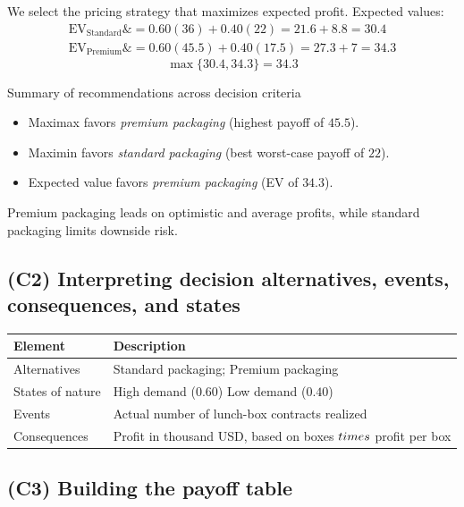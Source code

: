 \documentclass[11pt]{article}
\begin{document}
	
	We select the pricing strategy that maximizes expected profit. Expected values:
	\[
	\begin{aligned}
		\mathrm{EV}_{\text{Standard}} \&= 0.60(36) + 0.40(22) = 21.6 + 8.8 = 30.4 \\
		\mathrm{EV}_{\text{Premium}} \&= 0.60(45.5) + 0.40(17.5) = 27.3 + 7 = 34.3
	\end{aligned}
	\]
	\[
	\max\{30.4, 34.3\} = 34.3
	\]
	
	Summary of recommendations across decision criteria
	\begin{itemize}
		\item Maximax favors \emph{premium packaging} (highest payoff of $45.5$).
		\item Maximin favors \emph{standard packaging} (best worst-case payoff of $22$).
		\item Expected value favors \emph{premium packaging} (EV of $34.3$).
	\end{itemize}
	
	
	Premium packaging leads on optimistic and average profits, while standard packaging limits downside risk.
	
	\subsection*{(C2) Interpreting decision alternatives, events, consequences, and states}
	
	\hypertarget{problem4-c2}{}
	
	\begin{center}
		\begin{tabular}{ll}
			\toprule
			Element & Description \\
			\midrule
			Alternatives & Standard packaging; Premium packaging \\
			States of nature & High demand
			($0.60$)
			Low demand
			($0.40$) \\
			Events & Actual number of lunch-box contracts realized \\
			Consequences & Profit in thousand USD, based on boxes $\\times$ profit per box \\
			\bottomrule
		\end{tabular}
	\end{center}
	
	\subsection*{(C3) Building the payoff table}
	
\end{document}
